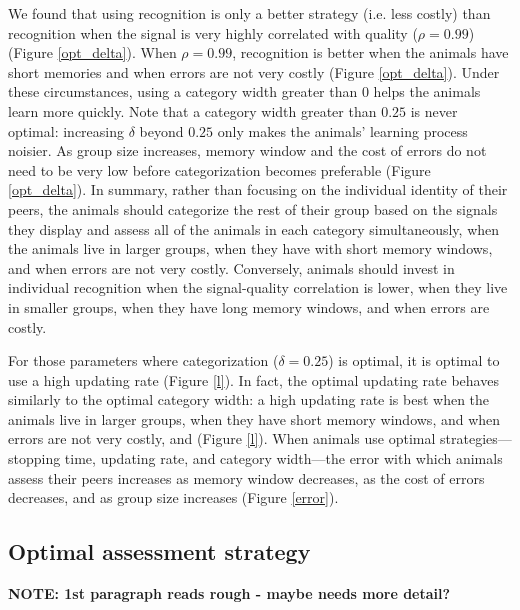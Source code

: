 We found that using recognition is only a better strategy (i.e. less costly) than recognition when the signal is very highly correlated with quality ($\rho=0.99$) (Figure \ref{opt_delta}). When $\rho=0.99$, recognition is better when the animals have short memories and when errors are not very costly (Figure \ref{opt_delta}). Under these circumstances, using a category width greater than $0$ helps the animals learn more quickly. Note that a category width greater than $0.25$ is never optimal: increasing $\delta$ beyond $0.25$ only makes the animals' learning process noisier. As group size increases, memory window and the cost of errors do not need to be very low before categorization becomes preferable (Figure \ref{opt_delta}). In summary, rather than focusing on the individual identity of their peers, the animals should categorize the rest of their group based on the signals they display and assess all of the animals in each category simultaneously, when the animals live in larger groups, when they have with short memory windows, and when errors are not very costly. Conversely, animals should invest in individual recognition when the signal-quality correlation is lower, when they live in smaller groups, when they have long memory windows, and when errors are costly. 

For those parameters where categorization ($\delta=0.25$) is optimal, it is optimal to use a high updating rate (Figure \ref{l}). In fact, the optimal updating rate behaves similarly to the optimal category width: a high updating rate is best when the animals live in larger groups, when they have short memory windows, and when errors are not very costly, and  (Figure \ref{l}). When animals use optimal strategies---stopping time, updating rate, and category width---the error with which animals assess their peers increases as memory window decreases, as the cost of errors decreases, and as group size increases (Figure \ref{error}). 


\subsection*{Optimal assessment strategy}
\textbf{NOTE: 1st paragraph reads rough - maybe needs more detail?} %

